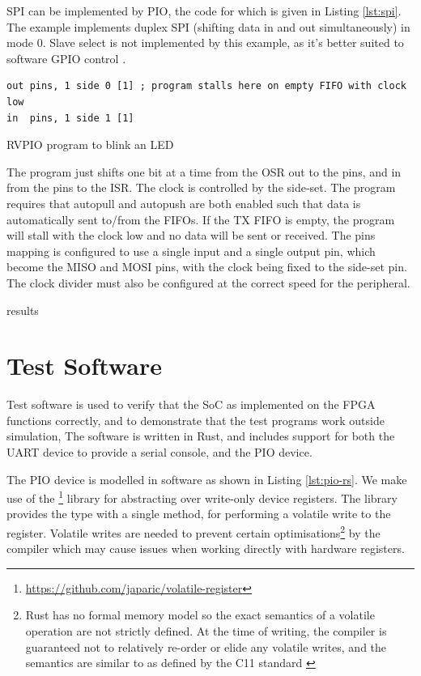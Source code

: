 SPI can be implemented by PIO, the code for which is given in Listing \ref{lst:spi}. The example implements duplex SPI (shifting data in and out simultaneously) in mode 0. Slave select is not implemented by this example, as it's better suited to software GPIO control \cite{rp2040}.

\begin{listing}[h!]
    \begin{verbatim}
out pins, 1 side 0 [1] ; program stalls here on empty FIFO with clock low
in  pins, 1 side 1 [1] 
    \end{verbatim}
    \caption{RVPIO program to blink an LED \cite{rp2040}}
    \label{lst:spi}
\end{listing}

The program just shifts one bit at a time from the OSR out to the pins, and in from the pins to the ISR. The clock is controlled by the side-set. The program requires that autopull and autopush are both enabled such that data is automatically sent to/from the FIFOs. If the TX FIFO is empty, the program will stall with the clock low and no data will be sent or received. The pins mapping is configured to use a single input and a single output pin, which become the MISO and MOSI pins, with the clock being fixed to the side-set pin. The clock divider must also be configured at the correct speed for the peripheral.

results


\section{Test Software}

Test software is used to verify that the SoC as implemented on the FPGA functions correctly, and to demonstrate that the test programs work outside simulation, The software is written in Rust, and includes support for both the UART device to provide a serial console, and the PIO device.

The PIO device is modelled in software as shown in Listing \ref{lst:pio-rs}. We make use of the \footnote{\url{https://github.com/japaric/volatile-register}} library for abstracting over write-only device registers. The library provides the  type with a single method,  for performing a volatile write to the register. Volatile writes are needed to prevent certain optimisations\footnote{Rust has no formal memory model so the exact semantics of a volatile operation are not strictly defined. At the time of writing, the compiler is guaranteed not to relatively re-order or elide any volatile writes, and the semantics are similar to as defined by the C11 standard \cite{rust-pointer, c11}} by the compiler which may cause issues when working directly with hardware registers.

